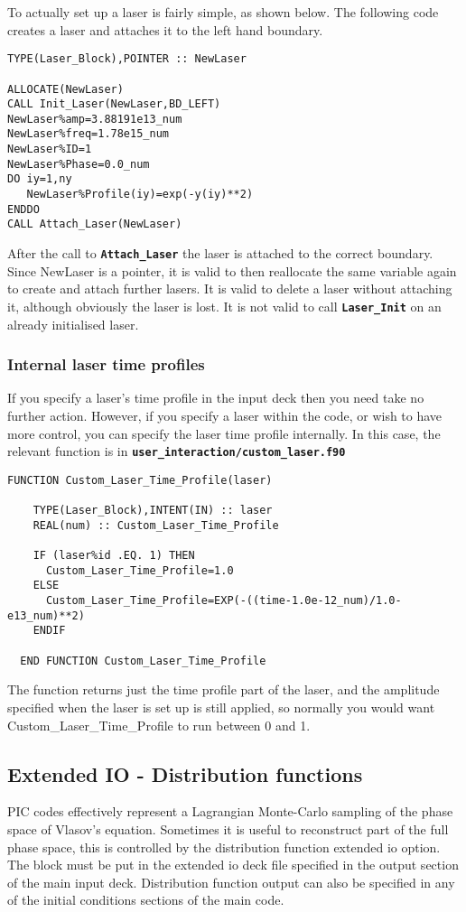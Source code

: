 \documentclass[12pt]{article}
\newcommand{\simpleboxverbatim}{\begin{Verbatim}[obeytabs=true,frame=single,
  framerule=0.5mm,rulecolor=\color{warwickmid}]}
\newcommand{\inlinecode}[1]{{\color{warwickred} \bf\texttt{#1}}}
\begin{document}
To actually set up a laser is fairly simple, as shown below. The following
code creates a laser and attaches it to the left hand boundary.
\simpleboxverbatim
TYPE(Laser_Block),POINTER :: NewLaser

ALLOCATE(NewLaser)
CALL Init_Laser(NewLaser,BD_LEFT)
NewLaser%amp=3.88191e13_num
NewLaser%freq=1.78e15_num
NewLaser%ID=1
NewLaser%Phase=0.0_num
DO iy=1,ny
   NewLaser%Profile(iy)=exp(-y(iy)**2)
ENDDO
CALL Attach_Laser(NewLaser)
\end{Verbatim}
After the call to \inlinecode{Attach\_Laser} the laser is attached to the
correct boundary. Since NewLaser is a pointer, it is valid to then reallocate
the same variable again to create and attach further lasers. It is valid to
delete a laser without attaching it, although obviously the laser is lost. It
is not valid to call \inlinecode{Laser\_Init} on an already initialised laser.

\subsubsection{Internal laser time profiles}
If you specify a laser's time profile in the input deck then you need take no
further action. However, if you specify a laser within the code, or wish to
have more control, you can specify the laser time profile internally. In this
case, the relevant function is in
\inlinecode{user\_interaction/custom\_laser.f90}
\simpleboxverbatim
  FUNCTION Custom_Laser_Time_Profile(laser)

    TYPE(Laser_Block),INTENT(IN) :: laser
    REAL(num) :: Custom_Laser_Time_Profile

    IF (laser%
      Custom_Laser_Time_Profile=1.0
    ELSE
      Custom_Laser_Time_Profile=EXP(-((time-1.0e-12_num)/1.0-e13_num)**2)
    ENDIF

  END FUNCTION Custom_Laser_Time_Profile
\end{Verbatim}
The function returns just the time profile part of the laser, and the
amplitude specified when the laser is set up is still applied, so normally you
would want Custom\_Laser\_Time\_Profile to run between 0 and 1.

\subsection{Extended IO - Distribution functions}
PIC codes effectively represent a Lagrangian Monte-Carlo sampling of the phase
space of Vlasov's equation. Sometimes it is useful to reconstruct part of the
full phase space, this is controlled by the distribution function extended io
option. The block must be put in the extended io deck file specified in the
output section of the main input deck. Distribution function output can also
be specified in any of the initial conditions sections of the main code.
\end{document}
